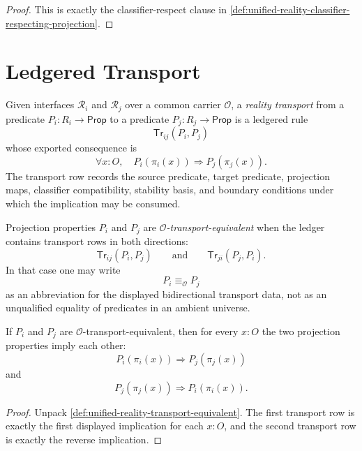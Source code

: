 \begin{proof}
This is exactly the classifier-respect clause in
\autoref{def:unified-reality-classifier-respecting-projection}.
\end{proof}

\section{Ledgered Transport}
\label{sec:unified-reality-ledgered-transport}

\begin{definition}
\label{def:unified-reality-transport}
Given interfaces $\mathcal R_i$ and $\mathcal R_j$ over a common carrier
$\mathcal O$, a \emph{reality transport} from a predicate
$P_i:R_i\to\mathsf{Prop}$ to a predicate $P_j:R_j\to\mathsf{Prop}$ is a
ledgered rule
$$
\mathsf{Tr}_{ij}(P_i,P_j)
$$
whose exported consequence is
$$
\forall x:O,\quad
P_i(\pi_i(x))
\Longrightarrow
P_j(\pi_j(x)).
$$
The transport row records the source predicate, target predicate,
projection maps, classifier compatibility, stability basis, and boundary
conditions under which the implication may be consumed.
\end{definition}

\begin{definition}
\label{def:unified-reality-transport-equivalent}
Projection properties $P_i$ and $P_j$ are
\emph{$\mathcal O$-transport-equivalent} when the ledger contains
transport rows in both directions:
$$
\mathsf{Tr}_{ij}(P_i,P_j)
\qquad\text{and}\qquad
\mathsf{Tr}_{ji}(P_j,P_i).
$$
In that case one may write
$$
P_i\equiv_{\mathcal O} P_j
$$
as an abbreviation for the displayed bidirectional transport data, not
as an unqualified equality of predicates in an ambient universe.
\end{definition}

\begin{theorem}
\label{thm:unified-reality-bidirectional-transport}
If $P_i$ and $P_j$ are $\mathcal O$-transport-equivalent, then for every
$x:O$ the two projection properties imply each other:
$$
P_i(\pi_i(x))
\Longrightarrow
P_j(\pi_j(x))
$$
and
$$
P_j(\pi_j(x))
\Longrightarrow
P_i(\pi_i(x)).
$$
\end{theorem}

\begin{proof}
Unpack \autoref{def:unified-reality-transport-equivalent}. The first
transport row is exactly the first displayed implication for each
$x:O$, and the second transport row is exactly the reverse implication.
\end{proof}

